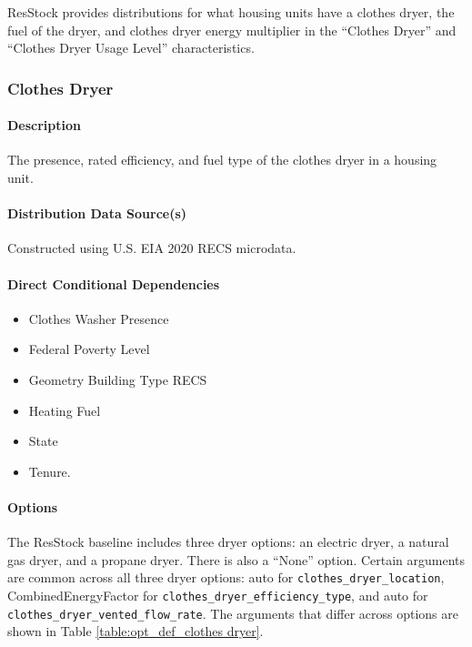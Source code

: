 ResStock provides distributions for what housing units have a clothes dryer, the fuel of the dryer, and clothes dryer energy multiplier in the “Clothes Dryer” and “Clothes Dryer Usage Level” characteristics. 

\subsubsection{Clothes Dryer}\label{clothes_dryer}
\paragraph{Description}
The presence, rated efficiency, and fuel type of the clothes dryer in a housing unit.

\paragraph{Distribution Data Source(s)}
Constructed using U.S. EIA 2020 RECS microdata. 

\paragraph{Direct Conditional Dependencies}
\begin{itemize}
    \item Clothes Washer Presence
    \item Federal Poverty Level
    \item Geometry Building Type RECS
    \item Heating Fuel
    \item State
    \item Tenure.
\end{itemize}

\paragraph{Options}
The ResStock baseline includes three dryer options: an electric dryer, a natural gas dryer, and a propane dryer. There is also a ``None'' option. Certain arguments are common across all three dryer options: auto for \texttt{clothes\_dryer\_location}, CombinedEnergyFactor for \texttt{clothes\_dryer\_efficiency\_type}, and auto for \texttt{clothes\_dryer\_vented\_flow\_rate}. The arguments that differ across options are shown in Table \ref{table:opt_def_clothes dryer}. 

